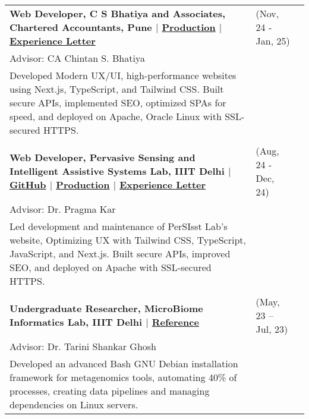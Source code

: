 \documentclass[10pt]{extarticle}
\begin{document}
\begin{contained}
\\
\begingroup%
\renewcommand\arraystretch{1}%
\begin{longtable}{p{}p{}p{}}
\textbf{Web Developer, C S Bhatiya and Associates, Chartered Accountants, Pune $\vert$ \href{https://csbhatiya.com/}{Production} $\vert$ \href{https://drive.google.com/file/d/1ERZEwunqZLcGdk9Fz-A9g0KW0qIyfU5l/view?usp=sharing}{Experience Letter} } &(Nov, 24 - Jan, 25)\\
    {Advisor: CA Chintan S. Bhatiya}\\
    Developed Modern UX/UI, high-performance websites using Next.js, TypeScript, and Tailwind CSS. Built secure APIs, implemented SEO, optimized SPAs for speed, and deployed on Apache, Oracle Linux with SSL-secured HTTPS.\\
    \\
    \textbf{Web Developer, Pervasive Sensing and Intelligent Assistive Systems Lab, IIIT Delhi $\vert$ \href{https://github.com/kintsugi-programmer/PerSIsst-Lab}{GitHub} $\vert$ \href{https://persisst.iiitd.edu.in/}{Production} $\vert$ \href{https://drive.google.com/file/d/1uVUchMiUUwhLph9rYhSjSyHx-VntRaQw/view?usp=sharing}{Experience Letter} } &(Aug, 24 - Dec, 24)\\
    {Advisor: Dr. Pragma Kar}\\
    Led development and maintenance of PerSIsst Lab's website, Optimizing UX with Tailwind CSS, TypeScript, JavaScript, and Next.js. Built secure APIs, improved SEO, and deployed on Apache with SSL-secured HTTPS.\\
    \\
    \textbf{Undergraduate Researcher, MicroBiome Informatics Lab, IIIT Delhi $\vert$ \href{https://drive.google.com/drive/folders/1c-4UNfR6s3NiEw_pWJEUwc6RTah0MxOR?usp=sharing}{Reference}} &(May, 23 – Jul, 23)\\
    {Advisor: Dr. Tarini Shankar Ghosh}\\ Developed an advanced Bash GNU Debian installation framework for metagenomics tools, automating 40\% of processes, creating data pipelines and managing dependencies on Linux servers.

\end{longtable}
\end{contained}
\end{document}
